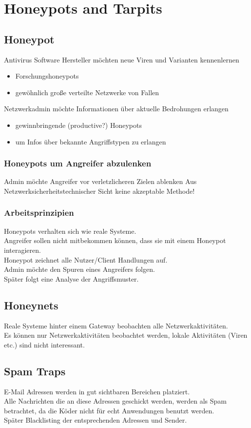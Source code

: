 \documentclass{article} %
\begin{document}
\section{Honeypots and Tarpits}

\subsection{Honeypot}
Antivirus Software Hersteller möchten neue Viren und Varianten kennenlernen
\begin{itemize}
	\item Forschungshoneypots
    \item gewöhnlich große verteilte Netzwerke von Fallen
\end{itemize}
Netzwerkadmin möchte Informationen über aktuelle Bedrohungen erlangen
\begin{itemize}
	\item gewinnbringende (productive?) Honeypots
    \item um Infos über bekannte Angriffstypen zu erlangen
\end{itemize}
\subsubsection{Honeypots um Angreifer abzulenken}
Admin möchte Angreifer vor verletzlicheren Zielen ablenken
Aus Netzwerksicherheitstechnischer Sicht keine akzeptable Methode!
\subsubsection{Arbeitsprinzipien}
Honeypots verhalten sich wie reale Systeme.\\
Angreifer sollen nicht mitbekommen können, dass sie mit einem Honeypot interagieren.\\
Honeypot zeichnet alle Nutzer/Client Handlungen auf.\\
	Admin möchte den Spuren eines Angreifers folgen.\\
Später folgt eine Analyse der Angriffsmuster.
\subsection{Honeynets}
Reale Systeme hinter einem Gateway beobachten alle Netzwerkaktivitäten.\\
Es können nur Netzwerkaktivitäten beobachtet werden, lokale Aktivitäten (Viren etc.) sind nicht interessant.\\
\subsection{Spam Traps}
E-Mail Adressen werden in gut sichtbaren Bereichen platziert.\\
Alle Nachrichten die an diese Adressen geschickt werden, werden als Spam betrachtet, da die Köder nicht für echt Anwendungen benutzt werden.\\
Später Blacklisting der entsprechenden Adressen und Sender.
\end{document}
